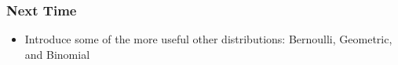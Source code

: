 \documentclass[handout]{beamer}
\begin{document}
\begin{frame}[fragile]
\frametitle{Next Time}

\begin{itemize}
\item Introduce some of the more useful other distributions: Bernoulli, Geometric, and Binomial
\end{itemize}


\end{frame}
\end{document}
